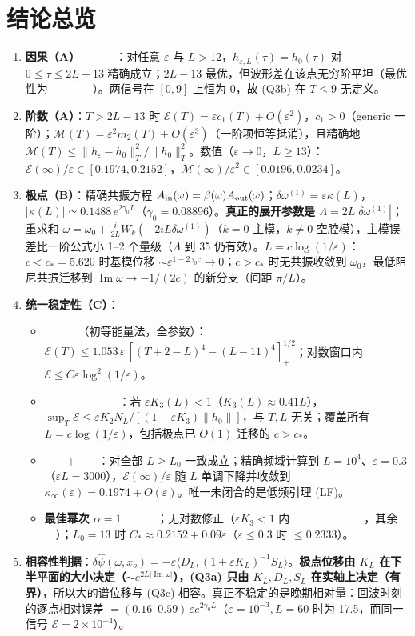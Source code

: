 \documentclass[11pt,a4paper,fontset=windows]{ctexart}
\newcommand{\tagbox}[2]{\begingroup\setlength{\fboxsep}{1.4pt}\colorbox{#1}{\textcolor{white}{\footnotesize\bfseries #2}}\endgroup}
\newcommand{\proven}{\tagbox{green!45!black}{已证明}}
\newcommand{\sketch}{\tagbox{teal!80!black}{证明概要}}
\newcommand{\condJ}{\tagbox{blue!65!black}{已证明\,|\,条件 J}}
\newcommand{\numer}{\tagbox{orange!85!black}{数值}}
\newcommand{\conj}{\tagbox{red!70!black}{猜想}}
\theoremstyle{definition}
\theoremstyle{definition}
\newcommand{\eps}{\varepsilon}
\newcommand{\cE}{\mathcal E}
\newcommand{\cM}{\mathcal M}
\newcommand{\Ain}{A_{\rm in}}
\newcommand{\Aout}{A_{\rm out}}
\renewcommand{\Im}{\operatorname{Im}}
\begin{document}
\section{结论总览}
\begin{enumerate}[leftmargin=1.5em]
\item \textbf{因果（A）}\,\proven：对任意 $\eps$ 与 $L>12$，$h_{\eps,L}(\tau)=h_0(\tau)$ 对 $0\le\tau\le2L-13$ 精确成立；$2L-13$ 最优，但波形差在该点无穷阶平坦（最优性为\sketch）。两信号在 $[0,9]$ 上恒为 0，故 (Q3b) 在 $T\le9$ 无定义。
\item \textbf{阶数（A）}：$T>2L-13$ 时 $\cE(T)=\eps c_1(T)+O(\eps^2)$，$c_1>0$（generic 一阶）；$\cM(T)=\eps^2m_2(T)+O(\eps^3)$（一阶项恒等抵消），且精确地 $\cM(T)\le\|h_\eps-h_0\|_T^2/\|h_0\|_T^2$。数值（$\eps\to0$，$L\ge13$）：$\cE(\infty)/\eps\in[0.1974,0.2152]$，$\cM(\infty)/\eps^2\in[0.0196,0.0234]$。
\item \textbf{极点（B）}：精确共振方程 $\Ain(\omega)=\beta(\omega)\Aout(\omega)$；$\delta\omega^{(1)}=\eps\kappa(L)$，$|\kappa(L)|\simeq0.1488\,e^{2\gamma_0L}$（$\gamma_0=0.08896$）。\textbf{真正的展开参数是 $\Lambda=2L|\delta\omega^{(1)}|$}；重求和 $\omega=\omega_0+\frac{i}{2L}W_k(-2iL\delta\omega^{(1)})$（$k=0$ 主模，$k\ne0$ 空腔模），主模误差比一阶公式小 1--2 个量级（$\Lambda$ 到 35 仍有效）。$L=c\log(1/\eps)$：$c<c_*=5.620$ 时基模位移 $\sim\eps^{1-2\gamma_0c}\to0$；$c>c_*$ 时无共振收敛到 $\omega_0$，最低阻尼共振迁移到 $\Im\omega\to-1/(2c)$ 的新分支（间距 $\pi/L$）。
\item \textbf{统一稳定性（C）}：
 \begin{itemize}
 \item \proven（初等能量法，全参数）：$\cE(T)\le1.053\,\eps\,[(T+2-L)^4-(L-11)^4]_+^{1/2}$；对数窗口内 $\cE\le C\eps\log^2(1/\eps)$。
 \item \condJ：若 $\eps K_3(L)<1$（$K_3(L)\approx0.41L$），$\sup_T\cE\le\eps K_2N_L/[(1-\eps K_3)\|h_0\|]$，与 $T,L$ 无关；覆盖所有 $L=c\log(1/\eps)$，包括极点已 $O(1)$ 迁移的 $c>c_*$。
 \item \numer+\conj：对全部 $L\ge L_0$ 一致成立；精确频域计算到 $L=10^4$、$\eps=0.3$（$\eps L=3000$），$\cE(\infty)/\eps$ 随 $L$ 单调下降并收敛到 $\kappa_\infty(\eps)=0.1974+O(\eps)$。唯一未闭合的是低频引理 (LF)。
 \item \textbf{最佳幂次 $\alpha=1$}\,\proven；无对数修正（$\eps K_3<1$ 内\condJ，其余\numer）；$L_0=13$ 时 $C_*\approx0.2152+0.09\eps$（$\eps\le0.3$ 时 $\le0.2333$）。
 \end{itemize}
\item \textbf{相容性判据}：$\delta\hat\psi(\omega,x_o)=-\eps\langle D_L,(1+\eps K_L)^{-1}S_L\rangle$。\textbf{极点位移由 $K_L$ 在下半平面的大小决定（$\sim e^{2L|\Im\omega|}$），(Q3a) 只由 $K_L,D_L,S_L$ 在实轴上决定（有界）}，所以大的谱位移与 (Q3c) 相容。真正不稳定的是晚期相对量：回波时刻的逐点相对误差 $=(0.16\text{--}0.59)\,\eps e^{2\gamma_0L}$（$\eps=10^{-3},L=60$ 时为 17.5，而同一信号 $\cE=2\times10^{-4}$）。
\end{enumerate}
\end{document}
